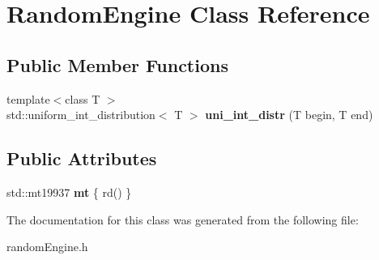 \hypertarget{class_random_engine}{}\section{Random\+Engine Class Reference}
\label{class_random_engine}
\subsection*{Public Member Functions}
\begin{DoxyCompactItemize}
\item 
\mbox{\label{class_random_engine_aa15034e27c41988d88e8997a39920f19}} 
{\footnotesize template$<$class T $>$ }\\std\+::uniform\+\_\+int\+\_\+distribution$<$ T $>$ {\bfseries uni\+\_\+int\+\_\+distr} (T begin, T end)
\end{DoxyCompactItemize}
\subsection*{Public Attributes}
\begin{DoxyCompactItemize}
\item 
\mbox{\label{class_random_engine_a2fa53184d1ebee9f6461056340c74d86}} 
std\+::mt19937 {\bfseries mt} \{ rd() \}
\end{DoxyCompactItemize}


The documentation for this class was generated from the following file\+:\begin{DoxyCompactItemize}
\item 
random\+Engine.\+h\end{DoxyCompactItemize}
